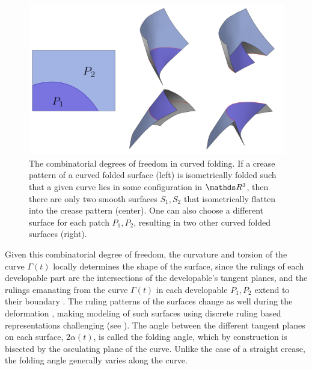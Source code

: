 \begin{figure} [h]
	\centering
	\includegraphics[width=\linewidth]{figures/curved_fold_through_curve.png}
	\caption{The combinatorial degrees of freedom in curved folding. If a crease pattern of a curved folded surface (left) is isometrically folded such that a given curve lies in some configuration in $\R^3$, then there are only two smooth surfaces $S_1,S_2$ that isometrically flatten into the crease pattern (center). One can also choose a different surface for each patch $P_1,P_2$, resulting in two other curved folded surfaces (right). }
	\label{fig:folding_combinatorics}
\end{figure}

Given this combinatorial degree of freedom, the curvature and torsion  of the curve $\Gamma(t)$ locally determines the shape of the surface, since the rulings of each developable part are the intersections of the developable's tangent planes, and the rulings emanating from the curve $\Gamma(t)$ in each developable $P_1,P_2$ extend to their boundary \cite{spivak,more_on_paper} . The ruling patterns of the surfaces change as well  during the deformation , making modeling of such surfaces using discrete ruling based representations challenging (see ). The angle between the different tangent planes on each surface, $2\alpha(t)$, is called the folding angle, which by construction is bisected by the osculating plane of the curve. Unlike the case of a straight crease, the folding angle generally varies along the curve. 

